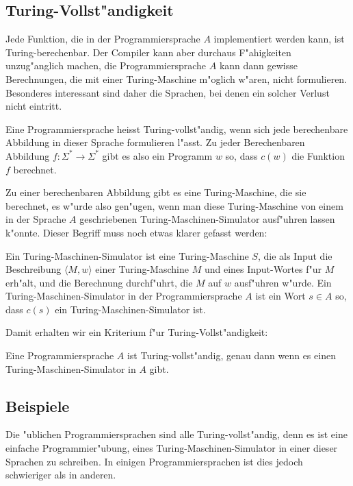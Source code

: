 \subsection{Turing-Vollst"andigkeit}
Jede Funktion, die in der Programmiersprache $A$ implementiert werden
kann, ist Turing-berechenbar.
Der Compiler kann
aber durchaus F"ahigkeiten unzug"anglich machen, die Programmiersprache
$A$ kann dann gewisse Berechnungen, die mit einer Turing-Maschine
m"oglich w"aren, nicht formulieren. Besonderes interessant sind daher
die Sprachen, bei denen ein solcher Verlust nicht eintritt.

\begin{definition}
Eine Programmiersprache heisst Turing-vollst"andig, wenn sich jede
berechenbare Abbildung in dieser Sprache formulieren l"asst. Zu
jeder Berechenbaren Abbildung $f\colon\Sigma^*\to \Sigma^*$ gibt
es also ein Programm $w$ so, dass $c(w)$ die Funktion $f$ berechnet.
\end{definition}

Zu einer berechenbaren Abbildung gibt es eine Turing-Maschine, die
sie berechnet, es w"urde also gen"ugen, wenn man diese Turing-Maschine
von einem in der Sprache $A$ geschriebenen Turing-Maschinen-Simulator
ausf"uhren lassen k"onnte. Dieser Begriff muss noch etwas klarer gefasst
werden:

\begin{definition}
Ein Turing-Maschinen-Simulator ist eine Turing-Maschine $S$, die als Input
die Beschreibung $\langle M,w\rangle$ einer Turing-Maschine $M$ und eines
Input-Wortes f"ur $M$ erh"alt, und die Berechnung durchf"uhrt, die $M$ auf $w$
ausf"uhren w"urde.
Ein Turing-Maschinen-Simulator in der Programmiersprache $A$ ist
ein Wort $s\in A$ so, dass $c(s)$ ein Turing-Maschinen-Simulator ist.
\end{definition}

Damit erhalten wir ein Kriterium f"ur Turing-Vollst"andigkeit:

\begin{satz}
\label{turingvollstaendigkeitskriterium}
Eine Programmiersprache $A$ ist Turing-vollst"andig, genau dann
wenn es einen Turing-Maschinen-Simulator in $A$ gibt.
\end{satz}


\subsection{Beispiele}
Die "ublichen Programmiersprachen sind alle Turing-vollst"andig, denn es
ist eine einfache Programmier"ubung, eines Turing-Maschinen-Simulator
in einer dieser Sprachen zu schreiben. In einigen Programmiersprachen
ist dies jedoch schwieriger als in anderen.

